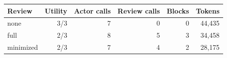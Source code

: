 \begin{tabular}{lrrrrr}
\hline
Review & Utility & Actor calls & Review calls & Blocks & Tokens \\
\hline
none & 3/3 & 7 & 0 & 0 & 44,435 \\
full & 2/3 & 8 & 5 & 3 & 34,458 \\
minimized & 2/3 & 7 & 4 & 2 & 28,175 \\
\hline
\end{tabular}
